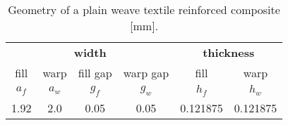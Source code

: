 { 





























}

\begin{table}[h]
\caption{Geometry of a plain weave textile reinforced composite [mm].}

	\renewcommand{\arraystretch}{1.3}
	\centering \footnotesize
	
	
	\begin{tabular}{cccccc} 
		
		\toprule
		\multicolumn{4}{c}{\textbf{width} }	& \multicolumn{2}{c}{\textbf{thickness} }  \\ 
		
	    \cmidrule(lr){1-4} \cmidrule(lr){5-6} 
		fill & warp & fill gap& warp gap& fill & warp\\
		
		\(a_f\) &\(a_w\)& \(g_f\)  & \(g_w\)  & \(h_f\)& \(h_w\) \\ 
		
		
		\cmidrule(lr){1-2} \cmidrule(lr){3-4} \cmidrule(lr){5-6}
		1.92 &2.0& 0.05& 0.05 & 0.121875 & 0.121875 \\
		
		\bottomrule 
	\end{tabular} 
	\label{tab:weave_geo}

\end{table}

